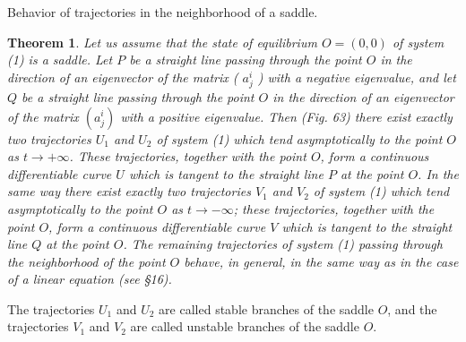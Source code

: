 \documentclass[10pt,a5paper]{book}
\theoremstyle{plain}
\newtheorem{theorem}{Theorem}
\theoremstyle{definition}
\theoremstyle{remark}
\begin{document}
Behavior of trajectories in the neighborhood of a saddle.

\begin{theorem}
Let us assume that the state of equilibrium $O=(0,0)$ of system (1) is a saddle. Let $P$ be a straight line passing through the point $O$ in the direction of an eigenvector of the matrix ( $a_{j}^{i}$ ) with a negative eigenvalue, and let $Q$ be a straight line passing through the point $O$ in the direction of an eigenvector of the matrix $\left(a_{j}^{i}\right)$ with a positive eigenvalue. Then (Fig. 63) there exist exactly two trajectories $U_{1}$ and $U_{2}$ of system (1) which tend asymptotically to the point $O$ as $t \rightarrow+\infty$. These trajectories, together with the point $O$, form a continuous differentiable curve $U$ which is tangent to the straight line $P$ at the point $O$. In the same way there exist exactly two trajectories $V_{1}$ and $V_{2}$ of system (1) which tend asymptotically to the point $O$ as $t \rightarrow-\infty$; these trajectories, together with the point $O$, form a continuous differentiable curve $V$ which is tangent to the straight line $Q$ at the point $O$. The remaining trajectories of system (1) passing through the neighborhood of the point $O$ behave, in general, in the same way as in the case of a linear equation (see §16).
\end{theorem}

The trajectories $U_{1}$ and $U_{2}$ are called stable branches of the saddle $O$, and the trajectories $V_{1}$ and $V_{2}$ are called unstable branches of the saddle $O$.
\end{document}

